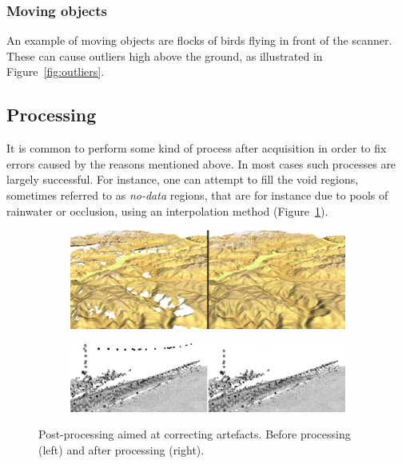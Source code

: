 \subsubsection{Moving objects}
An example of moving objects are flocks of birds flying in front of the scanner. These can cause outliers high above the ground, as illustrated in Figure~\ref{fig:outliers}.


\subsection{Processing}
It is common to perform some kind of process after acquisition in order to fix errors caused by the reasons mentioned above. 
In most cases such processes are largely successful. 
For instance, one can attempt to fill the void regions, sometimes referred to as \emph{no-data} regions, that are for instance due to pools of rainwater or occlusion, using an interpolation method (Figure~\ref{fig:voidfill}).
\begin{figure}
	\centering
	\begin{subfigure}{0.9\linewidth}
		\includegraphics[width=\textwidth]{figs/srtm_trento_voidfill.png}
		\label{fig:voidfill}
	\end{subfigure}
	
	\begin{subfigure}{0.9\linewidth}
		\includegraphics[width=\textwidth]{figs/ourlier-detection-wrong.png}
		\label{fig:outlier-wrong}
	\end{subfigure}
	\caption{Post-processing aimed at correcting artefacts. Before processing (left) and after processing (right).}
	\label{fig:processing}
\end{figure}
